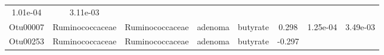 \documentclass[11pt,]{article}
\begin{document}
\begin{longtable}[]{@{}cccccccc@{}}
\begin{minipage}[t]{0.08\columnwidth}
1.01e-04\strut
\end{minipage} & \begin{minipage}[t]{0.08\columnwidth}\centering\strut
3.11e-03\strut
\end{minipage}\tabularnewline
\begin{minipage}[t]{0.08\columnwidth}\centering\strut
Otu00007\strut
\end{minipage} & \begin{minipage}[t]{0.15\columnwidth}\centering\strut
Ruminococcaceae\strut
\end{minipage} & \begin{minipage}[t]{0.15\columnwidth}\centering\strut
Ruminococcaceae\strut
\end{minipage} & \begin{minipage}[t]{0.08\columnwidth}\centering\strut
adenoma\strut
\end{minipage} & \begin{minipage}[t]{0.09\columnwidth}\centering\strut
butyrate\strut
\end{minipage} & \begin{minipage}[t]{0.07\columnwidth}\centering\strut
0.298\strut
\end{minipage} & \begin{minipage}[t]{0.08\columnwidth}\centering\strut
1.25e-04\strut
\end{minipage} & \begin{minipage}[t]{0.08\columnwidth}\centering\strut
3.49e-03\strut
\end{minipage}\tabularnewline
\begin{minipage}[t]{0.08\columnwidth}\centering\strut
Otu00253\strut
\end{minipage} & \begin{minipage}[t]{0.15\columnwidth}\centering\strut
Ruminococcaceae\strut
\end{minipage} & \begin{minipage}[t]{0.15\columnwidth}\centering\strut
Ruminococcaceae\strut
\end{minipage} & \begin{minipage}[t]{0.08\columnwidth}\centering\strut
adenoma\strut
\end{minipage} & \begin{minipage}[t]{0.09\columnwidth}\centering\strut
butyrate\strut
\end{minipage} & \begin{minipage}[t]{0.07\columnwidth}\centering\strut
-0.297\strut
\end{minipage} & \begin{minipage}[t]{0.08\columnwidth}\centering\strut

\end{minipage}
\end{longtable}
\end{document}
